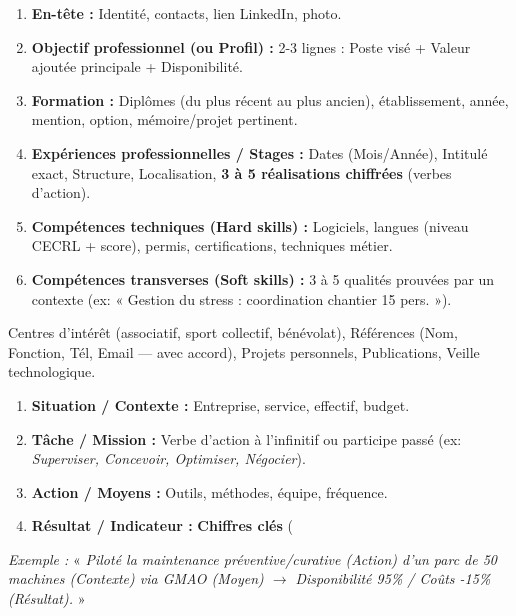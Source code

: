 \documentclass[11pt]{article}
\begin{document}
\begin{definition}
\begin{enumerate}
\item \textbf{En-tête :} Identité, contacts, lien LinkedIn, photo.
\item \textbf{Objectif professionnel (ou Profil) :} 2-3 lignes : Poste visé + Valeur ajoutée principale + Disponibilité.
\item \textbf{Formation :} Diplômes (du plus récent au plus ancien), établissement, année, mention, option, mémoire/projet pertinent.
\item \textbf{Expériences professionnelles / Stages :} Dates (Mois/Année), Intitulé exact, Structure, Localisation, \textbf{3 à 5 réalisations chiffrées} (verbes d'action).
\item \textbf{Compétences techniques (Hard skills) :} Logiciels, langues (niveau CECRL + score), permis, certifications, techniques métier.
\item \textbf{Compétences transverses (Soft skills) :} 3 à 5 qualités prouvées par un contexte (ex: « Gestion du stress : coordination chantier 15 pers. »).
\end{enumerate}
\end{definition}

\begin{definition}
Centres d'intérêt (associatif, sport collectif, bénévolat), Références (Nom, Fonction, Tél, Email — avec accord), Projets personnels, Publications, Veille technologique.
\end{definition}

\begin{methode}
\begin{enumerate}
\item \textbf{Situation / Contexte :} Entreprise, service, effectif, budget.
\item \textbf{Tâche / Mission :} Verbe d'action à l'infinitif ou participe passé (ex: \textit{Superviser, Concevoir, Optimiser, Négocier}).
\item \textbf{Action / Moyens :} Outils, méthodes, équipe, fréquence.
\item \textbf{Résultat / Indicateur :} \textbf{Chiffres clés} (%
\end{enumerate}
\textit{Exemple :} « \textit{Piloté la maintenance préventive/curative (Action) d'un parc de 50 machines (Contexte) via GMAO (Moyen) $\rightarrow$ Disponibilité 95\% / Coûts -15\% (Résultat).} »
\end{methode}
\end{document}

